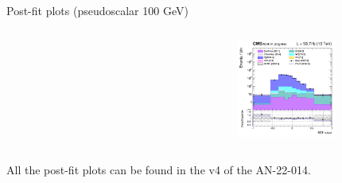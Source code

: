 \documentclass[8pt]{beamer}
\begin{document}
\begin{frame}{Post-fit plots (pseudoscalar 100 GeV)}
\begin{columns}
\begin{column}{0.33\textwidth}
\begin{center}
    		\end{center}		
		\end{column}
		\begin{column}{0.33\textwidth}
			\begin{center}
     			\includegraphics[width=1.0\textwidth, height=90pt]{figs/postfits/2018/log_cratio_TTbar_topCR_ll_BDT_ttDM100_TTbar_BDT_output_pseudoscalar100_customBinsAttempt7.png}
    		\end{center}		
		\end{column}
\end{columns} \vfill

All the post-fit plots can be found in the v4 of the AN-22-014. \vfill
\end{frame}
\end{document}
